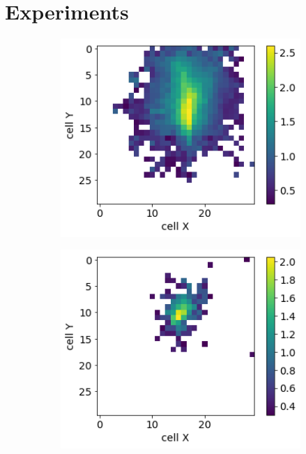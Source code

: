 \section{Experiments}

\begin{figure}
\captionsetup[subfigure]{justification=centering}
  \centering
  \begin{subfigure}{0.24\textwidth}
    \centering
    \includegraphics[width=1\textwidth]{figures/1_real.png}
  \end{subfigure}
  \begin{subfigure}{0.24\textwidth}
    \centering
    \includegraphics[width=1\textwidth]{figures/2_real.png}

\end{subfigure}
\end{figure}
